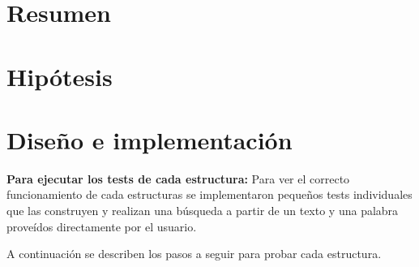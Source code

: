 \documentclass[14pt,letterpaper,hidelinks]{extarticle}
\begin{document}

\renewcommand{\sectionmark}[1]{\markright{\thesection.\ #1}}
\renewcommand{\headrulewidth}{0.5pt}

%
\tableofcontents
\listoffigures
\listoftables

\newpage
\section{Resumen}
\section{Hipótesis}
\section{Diseño e implementación}


\textbf{Para ejecutar los tests de cada estructura:}
Para ver el correcto funcionamiento de cada estructuras se implementaron pequeños tests individuales que las construyen y realizan una búsqueda a partir de un texto y una palabra proveídos directamente por el usuario.

A continuación se describen los pasos a seguir para probar cada estructura.
\end{document}
